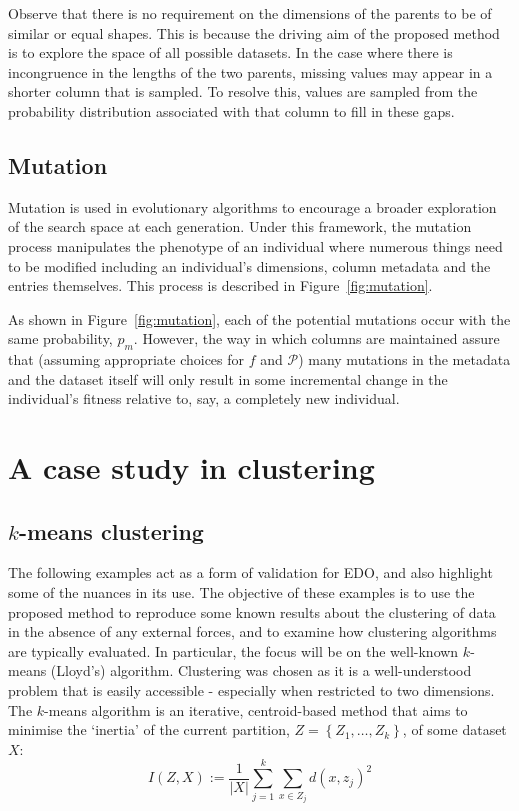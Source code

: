 Observe that there is no requirement on the dimensions of the parents to be of
similar or equal shapes. This is because the driving aim of the proposed method
is to explore the space of all possible datasets. In the case where there is
incongruence in the lengths of the two parents, missing values may appear in a
shorter column that is sampled. To resolve this, values are sampled from the
probability distribution associated with that column to fill in these gaps.


\subsection{Mutation}\label{subsection:mutation}

Mutation is used in evolutionary algorithms to encourage a broader exploration
of the search space at each generation. Under this framework, the mutation
process manipulates the phenotype of an individual where numerous things need to
be modified including an individual's dimensions, column metadata and the
entries themselves. This process is described in Figure~\ref{fig:mutation}.


As shown in Figure~\ref{fig:mutation}, each of the potential mutations occur
with the same probability, \(p_m\). However, the way in which columns are
maintained assure that (assuming appropriate choices for \(f\) and
\(\mathcal{P}\)) many mutations in the metadata and the dataset itself will only
result in some incremental change in the individual's fitness
relative to, say, a completely new individual.


\section{A case study in clustering}\label{section:examples}

\subsection{\(k\)-means clustering}

The following examples act as a form of validation for EDO, and also highlight
some of the nuances in its use. The objective of these examples is to use the
proposed method to reproduce some known results about the clustering of data in
the absence of any external forces, and to examine how clustering algorithms are
typically evaluated. In particular, the focus will be on the well-known
\(k\)-means (Lloyd's) algorithm. Clustering was chosen as it is a
well-understood problem that is easily accessible \-- especially when restricted
to two dimensions. The \(k\)-means algorithm is an iterative, centroid-based
method that aims to minimise the `inertia' of the current partition, \(Z =
\left\{Z_1, \ldots, Z_k\right\}\), of some dataset \(X\):
\begin{equation}
    I(Z, X) := \frac{1}{|X|} \sum_{j=1}^{k} \sum_{x \in Z_j} {d(x, z_j)}^2
    \label{eq:inertia}
\end{equation}

